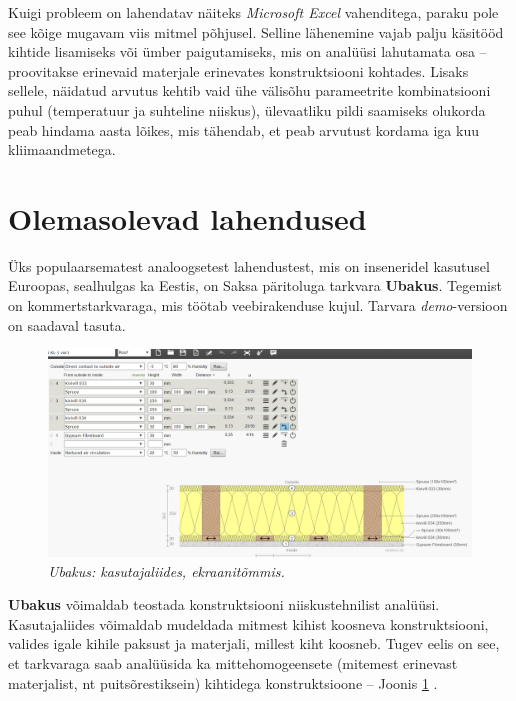 Kuigi probleem on lahendatav näiteks \textit{Microsoft Excel} vahenditega, paraku pole see kõige mugavam viis
mitmel põhjusel. Selline lähenemine vajab palju käsitööd kihtide lisamiseks või ümber paigutamiseks, mis on analüüsi lahutamata
osa -- proovitakse erinevaid materjale erinevates konstruktsiooni kohtades. Lisaks sellele, näidatud arvutus kehtib vaid ühe 
välisõhu parameetrite kombinatsiooni puhul (temperatuur ja suhteline niiskus), ülevaatliku pildi saamiseks olukorda peab hindama
 aasta lõikes, mis tähendab, et  peab arvutust kordama iga kuu kliimaandmetega.

\section{Olemasolevad lahendused}
\label{chapters:problem_statement_existing_solutions}
Üks populaarsematest analoogsetest lahendustest, mis on inseneridel kasutusel Euroopas, sealhulgas ka Eestis, on Saksa päritoluga tarkvara \textbf{Ubakus}. 
Tegemist on kommertstarkvaraga, mis töötab veebirakenduse kujul. Tarvara \textit{demo}-versioon on saadaval tasuta.
\begin{figure}[ht]
    \centering
    \includegraphics[width=1\textwidth]{figures/problem_statement/01_ubakus.png}
    \caption[Ubakus tarkvara katutajaliides, ekraanitõmmis]{\textit{Ubakus: kasutajaliides, ekraanitõmmis.}}
    \label{fig:ubakus_sample}
\end{figure}

\textbf{Ubakus} võimaldab teostada konstruktsiooni niiskustehnilist analüüsi. Kasutajaliides võimaldab 
mudeldada mitmest kihist koosneva konstruktsiooni, valides igale kihile paksust ja materjali, millest 
kiht koosneb. Tugev eelis on see, et tarkvaraga saab analüüsida ka mittehomogeensete (mitemest erinevast 
materjalist, nt puitsõrestiksein) kihtidega konstruktsioone -- Joonis \ref{fig:ubakus_sample} \cite{ubakus}.


